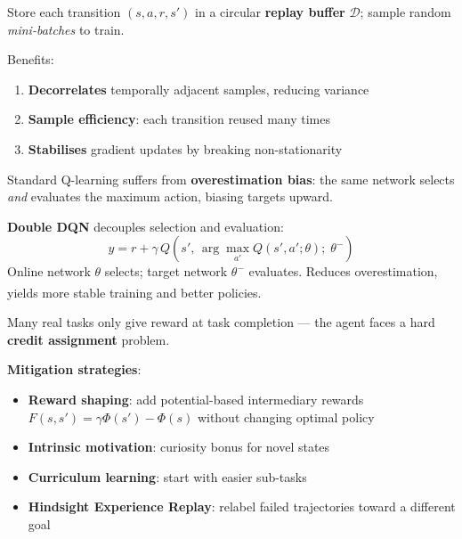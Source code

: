 \begin{tcbitemize}[ skin=sectionraster ]
        \tcbitem[title=Experience Replay, raster multicolumn=3]
        Store each transition $(s, a, r, s')$ in a circular \textbf{replay
        buffer} $\mathcal{D}$; sample random \emph{mini-batches} to train.

        Benefits:
        \begin{enumerate}
            \item \textbf{Decorrelates} temporally adjacent samples, reducing
                  variance
            \item \textbf{Sample efficiency}: each transition reused many times
            \item \textbf{Stabilises} gradient updates by breaking
                  non-stationarity
        \end{enumerate}
        \textsuperscript{\cite[][p.~351]{hurbansGrokkingArtificialIntelligence2020}}

        \tcbitem[title=Double Q-Learning, raster multicolumn=3]
        Standard Q-learning suffers from \textbf{overestimation bias}: the
        same network selects \emph{and} evaluates the maximum action, biasing
        targets upward.

        \textbf{Double DQN} decouples selection and evaluation:
        \begin{equation}
            y = r + \gamma\, Q\!\left(s',\, \arg\max_{a'} Q(s',a';\theta);\;\theta^-\right)
        \end{equation}
        Online network $\theta$ selects; target network $\theta^-$ evaluates.
        Reduces overestimation, yields more stable training and better
        policies.\textsuperscript{\cite[][p.~353]{hurbansGrokkingArtificialIntelligence2020}}

        \tcbitem[title={Sparse Rewards and Reward Shaping}, raster multicolumn=3]
        Many real tasks only give reward at task completion --- the agent faces
        a hard \textbf{credit assignment} problem.

        \textbf{Mitigation strategies}:
        \begin{itemize}
            \item \textbf{Reward shaping}: add potential-based intermediary
                  rewards $F(s,s') = \gamma \Phi(s') - \Phi(s)$ without
                  changing optimal policy
            \item \textbf{Intrinsic motivation}: curiosity bonus for novel states
            \item \textbf{Curriculum learning}: start with easier sub-tasks
            \item \textbf{Hindsight Experience Replay}: relabel failed
                  trajectories toward a different goal
        \end{itemize}
        \textsuperscript{\cite[][p.~357]{hurbansGrokkingArtificialIntelligence2020}}


\end{tcbitemize}

